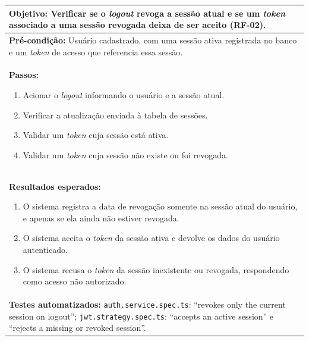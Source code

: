 \FloatBarrier
\begin{quadro}[h!]
\caption{Caso de teste CT01: validar a revogação da sessão no \textit{logout}}
\label{quad:ct01}
\begin{tabular}{|p{\dimexpr\linewidth-2\tabcolsep-2\arrayrulewidth\relax}|}
\hline
\textbf{Objetivo:} Verificar se o \textit{logout} revoga a sessão atual e se um \textit{token} associado a uma sessão revogada deixa de ser aceito (RF-02). \\ \hline
\textbf{Pré-condição:} Usuário cadastrado, com uma sessão ativa registrada no banco e um \textit{token} de acesso que referencia essa sessão. \\ \hline
\textbf{Passos:}
\begin{enumerate}[nosep,leftmargin=1.2em,topsep=2pt,partopsep=0pt,parsep=0pt,itemsep=1pt]
  \item Acionar o \textit{logout} informando o usuário e a sessão atual.
  \item Verificar a atualização enviada à tabela de sessões.
  \item Validar um \textit{token} cuja sessão está ativa.
  \item Validar um \textit{token} cuja sessão não existe ou foi revogada.
\end{enumerate} \\ \hline
\textbf{Resultados esperados:}
\begin{enumerate}[nosep,leftmargin=1.2em,topsep=2pt,partopsep=0pt,parsep=0pt,itemsep=1pt]
  \item O sistema registra a data de revogação somente na sessão atual do usuário, e apenas se ela ainda não estiver revogada.
  \item O sistema aceita o \textit{token} da sessão ativa e devolve os dados do usuário autenticado.
  \item O sistema recusa o \textit{token} da sessão inexistente ou revogada, respondendo como acesso não autorizado.
\end{enumerate} \\ \hline
\textbf{Testes automatizados:} \texttt{auth.service.spec.ts}: ``revokes only the current session on logout''; \texttt{jwt.strategy.spec.ts}: ``accepts an active session'' e ``rejects a missing or revoked session''. \\ \hline
\end{tabular}
\end{quadro}

